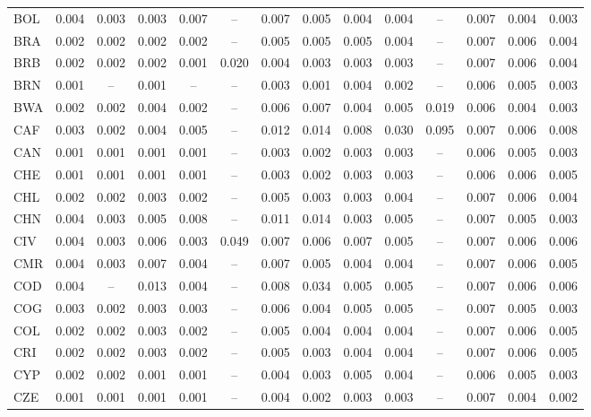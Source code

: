 \begin{longtable}{l*{13}{c}}
BOL & 0.004 & 0.003 & 0.003 & 0.007 & -- & 0.007 & 0.005 & 0.004 & 0.004 & -- & 0.007 & 0.004 & 0.003 \\
BRA & 0.002 & 0.002 & 0.002 & 0.002 & -- & 0.005 & 0.005 & 0.005 & 0.004 & -- & 0.007 & 0.006 & 0.004 \\
BRB & 0.002 & 0.002 & 0.002 & 0.001 & 0.020 & 0.004 & 0.003 & 0.003 & 0.003 & -- & 0.007 & 0.006 & 0.004 \\
BRN & 0.001 & -- & 0.001 & -- & -- & 0.003 & 0.001 & 0.004 & 0.002 & -- & 0.006 & 0.005 & 0.003 \\
BWA & 0.002 & 0.002 & 0.004 & 0.002 & -- & 0.006 & 0.007 & 0.004 & 0.005 & 0.019 & 0.006 & 0.004 & 0.003 \\
CAF & 0.003 & 0.002 & 0.004 & 0.005 & -- & 0.012 & 0.014 & 0.008 & 0.030 & 0.095 & 0.007 & 0.006 & 0.008 \\
CAN & 0.001 & 0.001 & 0.001 & 0.001 & -- & 0.003 & 0.002 & 0.003 & 0.003 & -- & 0.006 & 0.005 & 0.003 \\
CHE & 0.001 & 0.001 & 0.001 & 0.001 & -- & 0.003 & 0.002 & 0.003 & 0.003 & -- & 0.006 & 0.006 & 0.005 \\
CHL & 0.002 & 0.002 & 0.003 & 0.002 & -- & 0.005 & 0.003 & 0.003 & 0.004 & -- & 0.007 & 0.006 & 0.004 \\
CHN & 0.004 & 0.003 & 0.005 & 0.008 & -- & 0.011 & 0.014 & 0.003 & 0.005 & -- & 0.007 & 0.005 & 0.003 \\
CIV & 0.004 & 0.003 & 0.006 & 0.003 & 0.049 & 0.007 & 0.006 & 0.007 & 0.005 & -- & 0.007 & 0.006 & 0.006 \\
CMR & 0.004 & 0.003 & 0.007 & 0.004 & -- & 0.007 & 0.005 & 0.004 & 0.004 & -- & 0.007 & 0.006 & 0.005 \\
COD & 0.004 & -- & 0.013 & 0.004 & -- & 0.008 & 0.034 & 0.005 & 0.005 & -- & 0.007 & 0.006 & 0.006 \\
COG & 0.003 & 0.002 & 0.003 & 0.003 & -- & 0.006 & 0.004 & 0.005 & 0.005 & -- & 0.007 & 0.005 & 0.003 \\
COL & 0.002 & 0.002 & 0.003 & 0.002 & -- & 0.005 & 0.004 & 0.004 & 0.004 & -- & 0.007 & 0.006 & 0.005 \\
CRI & 0.002 & 0.002 & 0.003 & 0.002 & -- & 0.005 & 0.003 & 0.004 & 0.004 & -- & 0.007 & 0.006 & 0.005 \\
CYP & 0.002 & 0.002 & 0.001 & 0.001 & -- & 0.004 & 0.003 & 0.005 & 0.004 & -- & 0.006 & 0.005 & 0.003 \\
CZE & 0.001 & 0.001 & 0.001 & 0.001 & -- & 0.004 & 0.002 & 0.003 & 0.003 & -- & 0.007 & 0.004 & 0.002 \\

\end{longtable}
